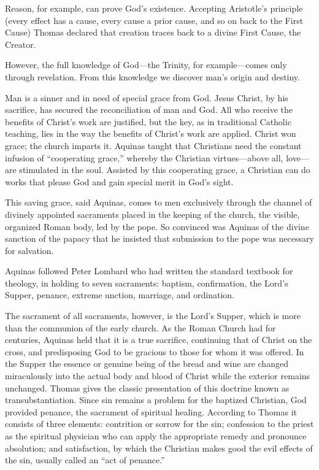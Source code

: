 Reason, for example, can prove God’s existence. Accepting Aristotle’s principle (every effect has a
cause, every cause a prior cause, and so on back to the First Cause) Thomas declared that creation
traces back to a divine First Cause, the Creator.

However, the full knowledge of God—the Trinity, for example—comes only through revelation. From this
knowledge we discover man’s origin and destiny.

Man is a sinner and in need of special grace from God. Jesus Christ, by his sacrifice, has secured
the reconciliation of man and God. All who receive the benefits of Christ’s work are justified, but
the key, as in traditional Catholic teaching, lies in the way the benefits of Christ’s work are
applied. Christ won grace; the church imparts it. Aquinas taught that Christians need the constant
infusion of “cooperating grace,” whereby the Christian virtues—above all, love—are stimulated in the
soul. Assisted by this cooperating grace, a Christian can do works that please God and gain special
merit in God’s sight.

This saving grace, said Aquinas, comes to men exclusively through the channel of divinely appointed
sacraments placed in the keeping of the church, the visible, organized Roman body, led by the pope.
So convinced was Aquinas of the divine sanction of the papacy that he insisted that submission to
the pope was necessary for salvation.

Aquinas followed Peter Lombard who had written the standard textbook for theology, in holding to
seven sacraments: baptism, confirmation, the Lord’s Supper, penance, extreme unction, marriage, and
ordination.

The sacrament of all sacraments, however, is the Lord’s Supper, which is more than the communion of
the early church. As the Roman Church had for centuries, Aquinas held that it is a true sacrifice,
continuing that of Christ on the cross, and predisposing God to be gracious to those for whom it was
offered. In the Supper the essence or genuine being of the bread and wine are changed miraculously
into the actual body and blood of Christ while the exterior remains unchanged. Thomas gives the
classic presentation of this doctrine known as transubstantiation. Since sin remains a problem for
the baptized Christian, God provided penance, the sacrament of spiritual healing. According to
Thomas it consists of three elements: contrition or sorrow for the sin; confession to the priest as
the spiritual physician who can apply the appropriate remedy and pronounce absolution; and
satisfaction, by which the Christian makes good the evil effects of the sin, usually called an “act
of penance.”

